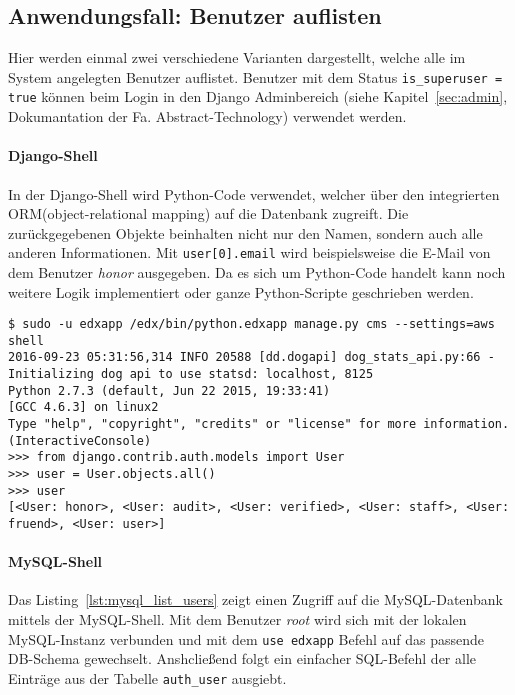 \documentclass{scrartcl}
\begin{document}
\subsection{Anwendungsfall: Benutzer auflisten}
\label{sec:uc_list_users}

Hier werden einmal zwei verschiedene Varianten dargestellt, welche alle im System angelegten Benutzer auflistet. Benutzer mit dem Status \lstinline|is_superuser = true| können beim Login in den Django Adminbereich (siehe Kapitel~\ref{sec:admin}, Dokumantation der Fa. Abstract-Technology) verwendet werden.

\paragraph{Django-Shell}

In der Django-Shell wird Python-Code verwendet, welcher über den integrierten ORM(object-relational mapping) auf die Datenbank zugreift. Die zurückgegebenen Objekte beinhalten nicht nur den Namen, sondern auch alle anderen Informationen. Mit \lstinline|user[0].email| wird beispielsweise die E-Mail von dem Benutzer \textit{honor} ausgegeben. Da es sich um Python-Code handelt kann noch weitere Logik implementiert oder ganze Python-Scripte geschrieben werden.

\begin{lstlisting}[caption={Auflisten aller Benutzer(Django)}, label=lst:django_list_users, breaklines]
$ sudo -u edxapp /edx/bin/python.edxapp manage.py cms --settings=aws shell
2016-09-23 05:31:56,314 INFO 20588 [dd.dogapi] dog_stats_api.py:66 - Initializing dog api to use statsd: localhost, 8125
Python 2.7.3 (default, Jun 22 2015, 19:33:41) 
[GCC 4.6.3] on linux2
Type "help", "copyright", "credits" or "license" for more information.
(InteractiveConsole)
>>> from django.contrib.auth.models import User
>>> user = User.objects.all()
>>> user
[<User: honor>, <User: audit>, <User: verified>, <User: staff>, <User: fruend>, <User: user>]

\end{lstlisting}

\paragraph{MySQL-Shell}
\label{p:uc_mysql}

Das Listing~\ref{lst:mysql_list_users} zeigt einen Zugriff auf die MySQL-Datenbank mittels der MySQL-Shell. Mit dem Benutzer \textit{root} wird sich mit der lokalen MySQL-Instanz verbunden und mit dem \lstinline|use edxapp| Befehl auf das passende DB-Schema gewechselt. Anshcließend folgt ein einfacher SQL-Befehl der alle Einträge aus der Tabelle \lstinline|auth_user| ausgiebt.
\end{document}
